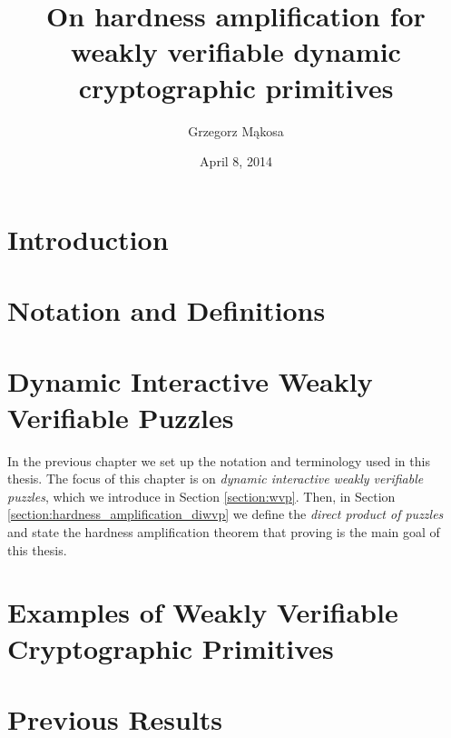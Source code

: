 \documentclass[11pt,a4paper,titlepage]{memoir}
\title{On hardness amplification for weakly verifiable dynamic cryptographic primitives}
\author{Grzegorz M\k{a}kosa}
\date{April 8, 2014}
\begin{document}
\frontmatter




\cleartorecto
\tableofcontents
\mainmatter

\chapter{Introduction}
\label{ch:introduction}

%
\chapter{Notation and Definitions}
\label{ch:preliminaries}

%
\chapter{Dynamic Interactive Weakly Verifiable Puzzles}
\label{ch:diwvp_main_thm}
In the previous chapter we set up the notation and terminology used in this thesis.
The focus of this chapter is on \textit{dynamic interactive weakly verifiable puzzles}, which we introduce in Section \ref{section:wvp}.
Then, in Section \ref{section:hardness_amplification_diwvp} we define the \textit{direct product of puzzles}
and state the hardness amplification theorem that proving is the main goal of this thesis.
%

%
\chapter{Examples of Weakly Verifiable Cryptographic Primitives}
\label{ch:examples_wvcp}

%
\chapter{Previous Results}
\label{ch:previous_results}

%
\end{document}
